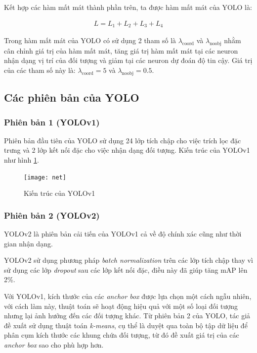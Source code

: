 \documentclass[../thesis.tex]{subfiles}
\begin{document}
Kết hợp các hàm mất mát thành phần trên, ta được hàm mất mát của YOLO là:

\begin{align*}
    L = L_1 + L_2 + L_3 + L_4
\end{align*}

Trong hàm mất mát của YOLO có sử dụng 2 tham số là $\lambda_\text{coord}$ và $\lambda_\text{noobj}$ nhằm cân chỉnh giá trị của hàm mất mát, tăng giá trị hàm mất mát tại các neuron nhận dạng vị trí của đối tượng và giảm tại các neuron dự đoán độ tin cậy. Giá trị của các tham số này là: $\lambda_\text{coord} = 5$ và $\lambda_\text{noobj} = 0.5$.

\subsection{Các phiên bản của YOLO}

\subsubsection{Phiên bản 1 (YOLOv1)}

Phiên bản đầu tiên của YOLO sử dụng 24 lớp tích chập cho việc trích lọc đặc trưng và 2 lớp kết nối đặc cho việc nhận dạng đối tượng. Kiến trúc của YOLOv1 như hình \ref{yolov1}.

\begin{figure}[H]
    \centering
    \texttt{[image: net]}
    \caption{Kiến trúc của YOLOv1}
    \label{yolov1}
\end{figure}
   
\subsubsection{Phiên bản 2 (YOLOv2)}

YOLOv2 là phiên bản cải tiến của YOLOv1 cả về độ chính xác cũng như thời gian nhận dạng. 

YOLOv2 sử dụng phương pháp \textit{batch normalization} trên các lớp tích chập thay vì sử dụng các lớp \textit{dropout} sau các lớp kết nối đặc, điều này đã giúp tăng mAP lên 2\%.

Với YOLOv1, kích thước của các \textit{anchor box} được lựa chọn một cách ngẫu nhiên, với cách làm này, thuật toán sẽ hoạt động hiệu quả với một số loại đối tượng nhưng lại ảnh hưởng đến các đối tượng khác. Từ phiên bản 2 của YOLO, tác giả đề xuất sử dụng thuật toán \textit{k-means}, cụ thể là duyệt qua toàn bộ tập dữ liệu để phân cụm kích thước các khung chứa đối tượng, từ đó đề xuất giá trị của các \textit{anchor box} sao cho phù hợp hơn.
\end{document}
